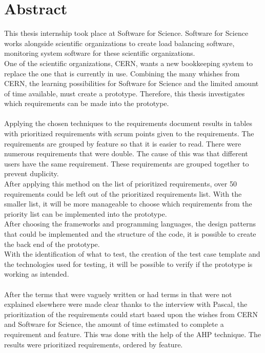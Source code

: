 \documentclass[paper=a4, fontsize=11pt,twoside]{scrartcl}	%
\begin{document}
\section*{Abstract}
This thesis internship took place at Software for Science. Software for Science works alongside scientific organizations to create load balancing software, monitoring system software for these scientific organizations. \\ One of the scientific organizations, CERN, wants a new bookkeeping system to replace the one that is currently in use. Combining the many whishes from CERN, the learning possibilities for Software for Science and the limited amount of time available, must create a prototype. Therefore, this thesis investigates which requirements can be made into the prototype. \\ \\
Applying the chosen techniques to the requirements document results in tables with prioritized requirements with scrum points given to the requirements. The requirements are grouped by feature so that it is easier to read. There were numerous requirements that were double. The cause of this was that different users have the same requirement. These requirements are grouped together to prevent duplicity. \\
After applying this method on the list of prioritized requirements, over 50 requirements could be left out of the prioritized requirements list. With the smaller list, it will be more manageable to choose which requirements from the priority list can be implemented into the prototype. \\
After choosing the frameworks and programming languages, the design patterns that could be implemented and the structure of the code, it is possible to create the back end of the prototype.    \\
With the identification of what to test, the creation of the test case template and the technologies used for testing, it will be possible to verify if the prototype is working as intended. \\ \\
After the terms that were vaguely written or had terms in that were not explained elsewhere were made clear thanks to the interview with Pascal, the prioritization of the requirements could start based upon the wishes from CERN and Software for Science, the amount of time estimated to complete a requirement and feature. This was done with the help of the AHP technique. The results were prioritized requirements, ordered by feature. \\ 
\end{document}
